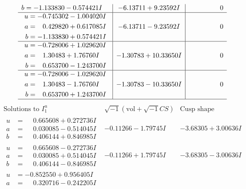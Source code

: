\documentclass[1p]{elsarticle_modified}
\theoremstyle{definition}
\newcommand{\I}{\sqrt{-1}}
\begin{document}
$$\begin{array}{c|c|c}
\begin{aligned}
b &= -1.133830 - 0.574421 I\end{aligned}
 & -6.13711 + 9.23592 I & \phantom{-0.000000 } 0 \\ \hline\begin{aligned}
u &= -0.745302 - 1.004020 I \\
a &= \phantom{-}0.429820 + 0.617085 I \\
b &= -1.133830 + 0.574421 I\end{aligned}
 & -6.13711 - 9.23592 I & \phantom{-0.000000 } 0 \\ \hline\begin{aligned}
u &= -0.728006 + 1.029620 I \\
a &= \phantom{-}1.30483 + 1.76760 I \\
b &= \phantom{-}0.653700 - 1.243700 I\end{aligned}
 & -1.30783 + 10.33650 I & \phantom{-0.000000 } 0 \\ \hline\begin{aligned}
u &= -0.728006 - 1.029620 I \\
a &= \phantom{-}1.30483 - 1.76760 I \\
b &= \phantom{-}0.653700 + 1.243700 I\end{aligned}
 & -1.30783 - 10.33650 I & \phantom{-0.000000 } 0\\
 \hline 
 \end{array}$$\newpage$$\begin{array}{c|c|c}  
\text{Solutions to }I^u_{1}& \I (\text{vol} + \sqrt{-1}CS) & \text{Cusp shape}\\
 \hline 
\begin{aligned}
u &= \phantom{-}0.665608 + 0.272736 I \\
a &= \phantom{-}0.030085 - 0.514045 I \\
b &= \phantom{-}0.406144 + 0.846985 I\end{aligned}
 & -0.11266 - 1.79745 I & -3.68305 + 3.00636 I \\ \hline\begin{aligned}
u &= \phantom{-}0.665608 - 0.272736 I \\
a &= \phantom{-}0.030085 + 0.514045 I \\
b &= \phantom{-}0.406144 - 0.846985 I\end{aligned}
 & -0.11266 + 1.79745 I & -3.68305 - 3.00636 I \\ \hline\begin{aligned}
u &= -0.852550 + 0.956405 I \\
a &= \phantom{-}0.320716 - 0.242205 I \\

\end{aligned}
\end{array}$$
\end{document}

